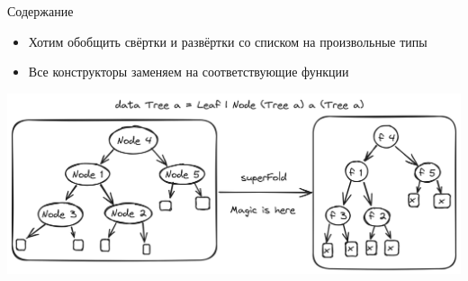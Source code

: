     \begin{frame}[noframenumbering]{Содержание}
        \tableofcontents
    \end{frame}


    \begin{frame}[fragile]{\secname}
        \begin{itemize}
            \item Хотим обобщить свёртки и развёртки со списком на произвольные типы
            \item Все конструкторы заменяем на соответствующие функции
        \end{itemize}
        \begin{center}
            \includegraphics[width=1\textwidth]{figs/genericFold.excalidraw}
        \end{center}
    \end{frame}

